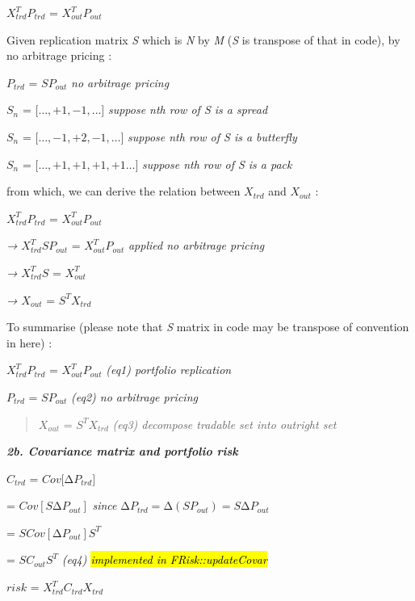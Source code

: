 \(X_{trd}^{T}P_{trd}\) = \(X_{out}^{T}P_{out}\)

Given replication matrix \emph{S} which is \emph{N} by \emph{M}
(\emph{S} is transpose of that in code), by no arbitrage pricing :

\(P_{trd}\) = \(SP_{out}\) \emph{no arbitrage pricing}

\(S_{n}\) = \(\lbrack\ldots, + 1, - 1,\ldots\rbrack\) \emph{suppose nth
row of S is a spread}

\(S_{n}\) = \(\lbrack\ldots, - 1, + 2, - 1,\ldots\rbrack\) \emph{suppose
nth row of S is a butterfly}

\(S_{n}\) = \(\lbrack\ldots, + 1, + 1, + 1, + 1\ldots\rbrack\)
\emph{suppose nth row of S is a pack}

from which, we can derive the relation between \(X_{trd}\) and
\(X_{out}\) :

\(X_{trd}^{T}P_{trd}\) = \(X_{out}^{T}P_{out}\)

\emph{→} \(X_{trd}^{T}SP_{out}\) = \(X_{out}^{T}P_{out}\) \emph{applied
no arbitrage pricing}

\emph{→} \(X_{trd}^{T}S\) = \(X_{out}^{T}\)

\emph{→} \(X_{out}\) = \(S^{T}X_{trd}\)

To summarise (please note that \emph{S} matrix in code may be transpose
of convention in here) :

\(X_{trd}^{T}P_{trd}\) = \(X_{out}^{T}P_{out}\) \emph{(eq1) portfolio
replication}

\(P_{trd}\) = \(SP_{out}\) \emph{(eq2) no arbitrage pricing}

\begin{quote}
\(X_{out}\) = \(S^{T}X_{trd}\) \emph{(eq3) decompose tradable set into
outright set}
\end{quote}

\emph{\textbf{\hfill\break
}}

\emph{\textbf{2b. Covariance matrix and portfolio risk}}

\(C_{trd}\) = \(Cov\lbrack\mathrm{\Delta}P_{trd}\rbrack\)

= \(Cov\left\lbrack S\mathrm{\Delta}P_{out} \right\rbrack\) \emph{since}
\({\mathrm{\Delta}P}_{trd} = \mathrm{\Delta}\left( SP_{out} \right) = S\mathrm{\Delta}P_{out}\)

= \(SCov\left\lbrack \mathrm{\Delta}P_{out} \right\rbrack S^{T}\)

= \(SC_{out}S^{T}\) \emph{(eq4) \hl{implemented in FRisk::updateCovar}}

\(risk\) = \(X_{trd}^{T}C_{trd}X_{trd}\)

